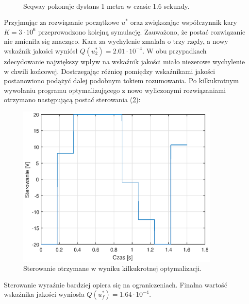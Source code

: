 \begin{figure}[H]
	~~
	\caption{Seqway pokonuje dystans 1 metra w czasie 1.6 sekundy.}
	\label{fig:equ1}
\end{figure}
Przyjmując za rozwiązanie początkowe $u^*$ oraz zwiększając współczynnik kary $K=3\cdot10^6$ przeprowadzono kolejną symulację. Zauważono, że postać rozwiązanie nie zmieniła się znacząco. Kara za wychylenie zmalała o trzy rzędy, a nowy wskaźnik jakości wyniósł    $Q(u_2^*)=2.01\cdot10^{-4}$. W obu przypadkach zdecydowanie największy wpływ na wskaźnik jakości miało niezerowe wychylenie w chwili końcowej. Dostrzegając różnicę pomiędzy wskaźnikami jakości postanowiono podążyć dalej podobnym tokiem rozumowania. Po kilkukrotnym wywołaniu programu optymalizującego z nowo wyliczonymi rozwiązaniami otrzymano następującą postać sterowania (\ref{fig:ctrNew}):
\begin{figure}[H]
	\centering
	\includegraphics[width=4in]{Figures/exp1/controlNew.eps}
	\caption{Sterowanie otrzymane w wyniku kilkukrotnej optymalizacji.}
	\label{fig:ctrNew}
\end{figure}
Sterowanie wyraźnie bardziej opiera się na ograniczeniach. Finalna wartość wskaźnika jakości wyniosła $Q(u_f^*)=1.64\cdot10^{-4}$.
